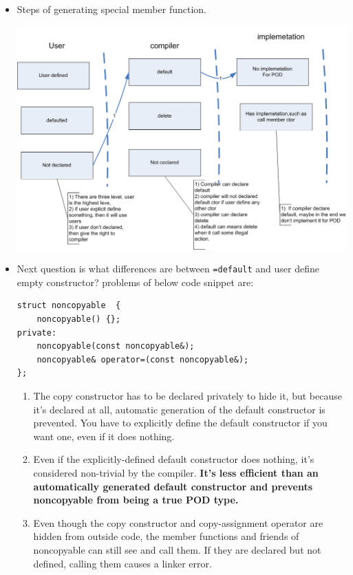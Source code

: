 \documentclass[a4paper,11pt,twoside]{book}
\begin{document}
\begin{itemize}
    \item Steps of generating special member function. 
\begin{center}
\includegraphics[scale=0.8]{pics/ctor.png} 
\end{center}
\item Next question is what differences are between \verb|=default| and user define empty constructor? problems of below code snippet are:
\begin{lstlisting}[numbers=none]
struct noncopyable  {
	noncopyable() {};
private:
	noncopyable(const noncopyable&);
	noncopyable& operator=(const noncopyable&);
};
\end{lstlisting}
\begin{enumerate}
	\item The copy constructor has to be declared privately to hide it, but because it's declared at all, automatic generation of the default constructor is prevented. You have to explicitly define the default constructor if you want one, even if it does nothing.

	\item Even if the explicitly-defined default constructor does nothing, it's considered non-trivial by the compiler. \textbf{It's less efficient than an automatically generated default constructor and prevents noncopyable from being a true POD type.}

	\item Even though the copy constructor and copy-assignment operator are hidden from outside code, the member functions and friends of noncopyable can still see and call them. If they are declared but not defined, calling them causes a linker error.


\end{enumerate}
\end{itemize}
\end{document}
